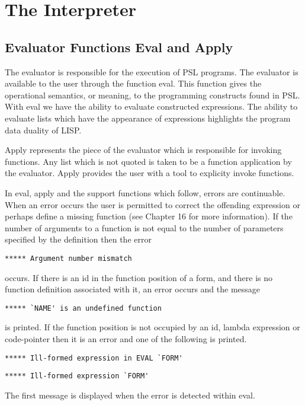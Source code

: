 \chapter{The Interpreter}

\section{Evaluator Functions Eval and Apply}

  The   evaluator  is  responsible  for  the  execution  of  PSL
programs. The evaluator is available to  the  user  through  the
function  eval.   This function gives the operational semantics,
or meaning, to the programming constructs found in  PSL.    With
eval  we  have  the ability to evaluate constructed expressions.
The ability to evaluate  lists  which  have  the  appearance  of
expressions highlights the program data duality of LISP.

  Apply   represents   the  piece  of  the  evaluator  which  is
responsible for invoking functions.    Any  list  which  is  not
quoted  is  taken to be a function application by the evaluator.
Apply  provides  the  user  with  a  tool  to  explicity  invoke
functions.

  In  eval, apply and the support functions which follow, errors
are continuable.  When an error occurs the user is permitted  to
correct  the  offending  expression  or perhaps define a missing
function (see Chapter 16 for more information).  If  the  number
of  arguments  to  a  function  is  not  equal  to the number of
parameters specified by the definition then the error

\begin{verbatim}
***** Argument number mismatch
\end{verbatim}
occurs.  If there is an id in the function position of  a  form,
and there is no function definition associated with it, an error
occurs and the message

\begin{verbatim}
***** `NAME' is an undefined function
\end{verbatim}
is  printed.  If the function position is not occupied by an id,
lambda expression or code-pointer then it is an error and one of
the following is printed.

\begin{verbatim}
***** Ill-formed expression in EVAL `FORM'
\end{verbatim}
\begin{verbatim}
***** Ill-formed expression `FORM'
\end{verbatim}
The first message is displayed when the error is detected within
eval.

